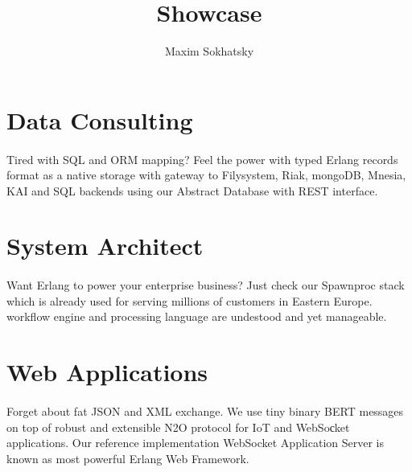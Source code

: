 \documentclass[11pt]{article}
\begin{document}
\title{Showcase}
\author{Maxim Sokhatsky}


\section*{Data Consulting}
\paragraph{}
    Tired with SQL and ORM mapping? Feel the power with typed Erlang
    records format as a native storage with gateway to Filysystem,
    Riak, mongoDB, Mnesia, KAI and SQL backends using our
     Abstract Database with REST interface.

\section*{System Architect}
\paragraph{}
    Want Erlang to power your enterprise business?
    Just check our Spawnproc stack which is already used for
    serving millions of customers in Eastern Europe.
     workflow engine and
     processing language
    are undestood and yet manageable.

\section*{Web Applications}
\paragraph{}
    Forget about fat JSON and XML exchange.
    We use tiny binary BERT messages on top of robust and extensible
    N2O protocol for IoT and WebSoсket applications.
    Our reference implementation  WebSocket Application Server is known as most powerful Erlang Web Framework.
\end{document}
